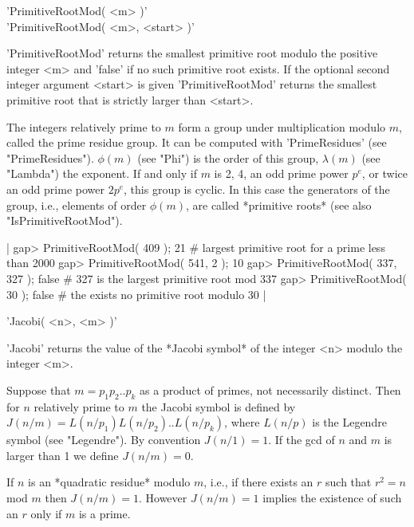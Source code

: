 %
%
%

'PrimitiveRootMod( <m> )' \\
'PrimitiveRootMod( <m>, <start> )'

'PrimitiveRootMod' returns    the  smallest  primitive   root modulo  the
positive integer <m>  and 'false' if  no such primitive  root exists.  If
the optional second integer argument  <start> is given 'PrimitiveRootMod'
returns the smallest primitive root that is strictly larger than <start>.

The integers  relatively prime to  $m$ form a group under  multiplication
modulo $m$,  called the  prime residue group.    It can be computed  with
'PrimeResidues'  (see  "PrimeResidues").  $\phi(m)$ (see   "Phi") is  the
order of this group,  $\lambda(m)$ (see "Lambda")  the exponent.   If and
only  if $m$  is 2, 4,  an odd prime  power $p^e$, or twice an  odd prime
power $2 p^e$, this group is cyclic.  In  this case the generators of the
group, i.e., elements  of  order  $\phi(m)$, are called *primitive roots*
(see also "IsPrimitiveRootMod").

|    gap> PrimitiveRootMod( 409 );
    21        # largest primitive root for a prime less than 2000
    gap> PrimitiveRootMod( 541, 2 );
    10
    gap> PrimitiveRootMod( 337, 327 );
    false        # 327 is the largest primitive root mod 337
    gap> PrimitiveRootMod( 30 );
    false        # the exists no primitive root modulo 30 |

%

'Jacobi( <n>, <m> )'

'Jacobi'  returns  the value of  the *Jacobi symbol*  of  the integer <n>
modulo the integer <m>.

Suppose that $m = p_1 p_2 .. p_k$ as a product of primes, not necessarily
distinct.   Then for $n$  relatively prime to $m$   the Jacobi  symbol is
defined by $J(n/m) =  L(n/p_1)  L(n/p_2) ..  L(n/p_k)$, where $L(n/p)$ is
the Legendre symbol (see  "Legendre").   By convention $J(n/1)  = 1$.  If
the gcd of $n$ and $m$ is larger than 1 we define $J(n/m) = 0$.

If $n$ is an *quadratic residue* modulo $m$, i.e., if there exists an $r$
such that  $r^2 =  n$ mod  $m$  then $J(n/m)  = 1$.  However $J(n/m) = 1$
implies the existence of such an $r$ only if $m$ is a prime.

